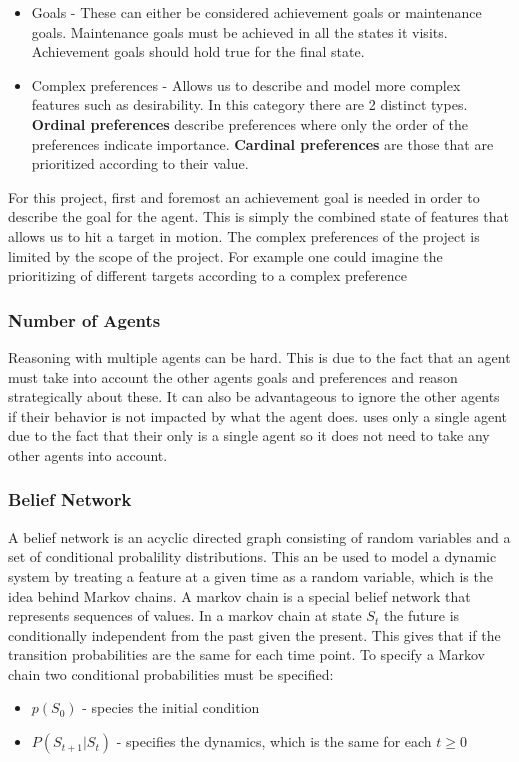 \begin{itemize}
  \item Goals - These can either be considered achievement goals or
  maintenance goals. Maintenance goals must be achieved in all the states
  it visits. Achievement goals should hold true for the final state.
  \item Complex preferences - Allows us to describe and model more complex
  features such as desirability. In this category there are 2 distinct types.
  \textbf{Ordinal preferences} describe preferences where only the order of the
  preferences indicate importance. \textbf{Cardinal preferences} are those that
  are prioritized according to their value.
\end{itemize}

For this project, first and foremost an achievement goal is needed in order to
describe the goal for the agent. This is simply the combined state of features
that allows us to hit a target in motion. The complex preferences of the
project is limited by the scope of the project. For example one could imagine
the prioritizing of different targets according to a complex preference

\subsubsection{Number of Agents}
Reasoning with multiple agents can be hard. This is due to the fact that an
agent must take into account the other agents goals and preferences and reason
strategically about these. It can also be advantageous to ignore the other
agents if their behavior is not impacted by what the agent does.
\namep uses only a single agent due to the fact that their only is a single
agent so it does not need to take any other agents into account.

\subsubsection{Belief Network}
A belief network is an acyclic directed graph consisting of random variables and
a set of conditional probalility distributions. This an be used to model a
dynamic system by treating a feature at a given time as a random variable, which
is the idea behind Markov chains. A markov chain is a special belief network
that represents sequences of values.
In a markov chain at state $S_t$ the future is conditionally independent from
the past given the present. This gives that if the transition probabilities are
the same for each time point. To specify a Markov chain two conditional
probabilities must be specified:
\begin{itemize}
  \item $p(S_0)$ - species the initial condition
  \item $P(S_{t+1}|S_t)$ - specifies the dynamics, which is the same for each $t
  \geq 0$
\end{itemize}

